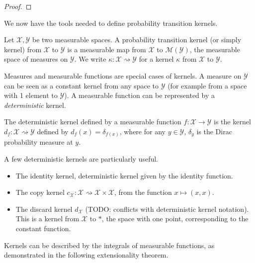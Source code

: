 \begin{proof}\mathlibok
\uses{}
\end{proof}

We now have the tools needed to define probability transition kernels.

\begin{definition}[Kernel]
  \label{def:kernel}
  \mathlibok
  Let $\mathcal X, \mathcal Y$ be two measurable spaces.
  A probability transition kernel (or simply kernel) from $\mathcal X$ to $\mathcal Y$ is a measurable map from $\mathcal X$ to $\mathcal M (\mathcal Y)$, the measurable space of measures on $\mathcal Y$.
  We write $\kappa : \mathcal X \rightsquigarrow \mathcal Y$ for a kernel $\kappa$ from $\mathcal X$ to $\mathcal Y$.
\end{definition}

Measures and measurable functions are special cases of kernels. A measure on $\mathcal Y$ can be seen as a constant kernel from any space to $\mathcal Y$ (for example from a space with 1 element to $\mathcal Y$).
A measurable function can be represented by a \emph{deterministic} kernel.

\begin{definition}
  \label{def:deterministic_kernel}
  \mathlibok
  The deterministic kernel defined by a measurable function $f : \mathcal X \to \mathcal Y$ is the kernel $d_f: \mathcal X \rightsquigarrow \mathcal Y$ defined by $d_f(x) = \delta_{f(x)}$, where for any $y \in \mathcal Y$, $\delta_y$ is the Dirac probability measure at $y$.
\end{definition}

A few deterministic kernels are particularly useful.
\begin{itemize}
  \item The identity kernel, deterministic kernel given by the identity function.
  \item The copy kernel $c_{\mathcal X} : \mathcal X \rightsquigarrow \mathcal X \times \mathcal X$, from the function $x \mapsto (x, x)$.
  \item The discard kernel $d_{\mathcal X}$ (TODO: conflicts with deterministic kernel notation). This is a kernel from $\mathcal X$ to $*$, the space with one point, corresponding to the constant function.
\end{itemize}

Kernels can be described by the integrals of measurable functions, as demonstrated in the following extensionality theorem.

